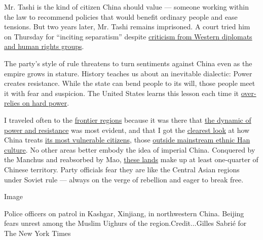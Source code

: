 Mr. Tashi is the kind of citizen China should value --- someone working
within the law to recommend policies that would benefit ordinary people
and ease tensions. But two years later, Mr. Tashi remains imprisoned. A
court tried him on Thursday for ``inciting separatism'' despite
\href{https://www.nytimes3xbfgragh.onion/2017/01/18/world/asia/china-tibetan-education-advocate.html}{criticism
from Western diplomats and human rights groups}.

The party's style of rule threatens to turn sentiments against China
even as the empire grows in stature. History teaches us about an
inevitable dialectic: Power creates resistance. While the state can bend
people to its will, those people meet it with fear and suspicion. The
United States learns this lesson each time it
\href{https://www.nytimes3xbfgragh.onion/column/vietnam-67}{over-relies
on hard power}.

I traveled often to the
\href{http://www.nytimes3xbfgragh.onion/2010/07/25/world/asia/25tibet.html}{frontier
regions} because it was there that
\href{https://www.nytimes3xbfgragh.onion/2016/06/19/world/asia/china-climate-change-nu-river-greenhouse-gases.html}{the
dynamic of power and resistance} was most evident, and that I got the
\href{https://www.nytimes3xbfgragh.onion/interactive/2016/10/25/world/asia/china-climate-change-resettlement.html}{clearest
look} at how China treats
\href{http://www.nytimes3xbfgragh.onion/2009/02/26/world/asia/26tibet.html}{its
most vulnerable citizens}, those
\href{https://www.nytimes3xbfgragh.onion/interactive/2016/10/25/world/asia/china-climate-change-resettlement.html}{outside
mainstream ethnic Han culture}. No other areas better embody the idea of
imperial China. Conquered by the Manchus and reabsorbed by Mao,
\href{https://www.nytimes3xbfgragh.onion/interactive/2016/10/24/world/asia/living-in-chinas-expanding-deserts.html}{these
lands} make up at least one-quarter of Chinese territory. Party
officials fear they are like the Central Asian regions under Soviet rule
--- always on the verge of rebellion and eager to break free.

Image

Police officers on patrol in Kashgar, Xinjiang, in northwestern China.
Beijing fears unrest among the Muslim Uighurs of the
region.Credit...Gilles Sabrié for The New York Times

